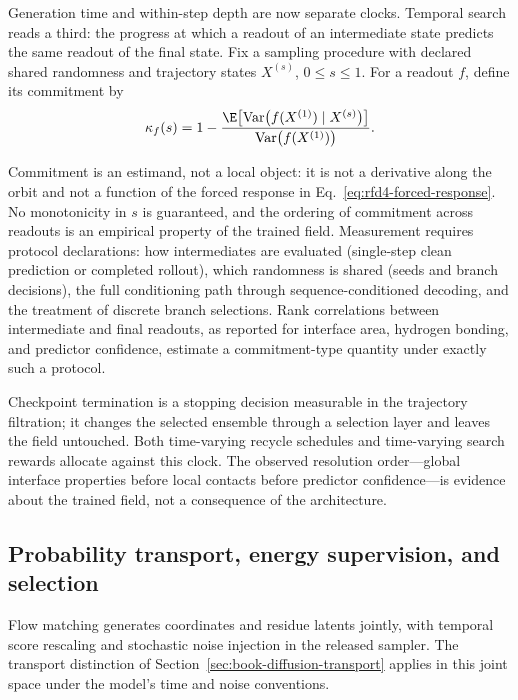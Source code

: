 Generation time and within-step depth are now separate clocks.  Temporal search reads a third:
the progress at which a readout of an intermediate state predicts the same readout of the final
state.  Fix a sampling procedure with declared shared randomness and trajectory states
$X^{(s)}$, $0\le s\le 1$.  For a readout $f$, define its commitment by
\begin{equation}
\kappa_f(s)
=1-\frac{\E\bigl[\operatorname{Var}\bigl(f(X^{(1)})\mid X^{(s)}\bigr)\bigr]}
{\operatorname{Var}\bigl(f(X^{(1)})\bigr)}.
\label{eq:rfd4-commitment}
\end{equation}

Commitment is an estimand, not a local object: it is not a derivative along the orbit and not a
function of the forced response in Eq.~\ref{eq:rfd4-forced-response}.  No monotonicity in $s$ is
guaranteed, and the ordering of commitment across readouts is an empirical property of the
trained field.  Measurement requires protocol declarations: how intermediates are evaluated
(single-step clean prediction or completed rollout), which randomness is shared (seeds and branch
decisions), the full conditioning path through sequence-conditioned decoding, and the treatment
of discrete branch selections.  Rank correlations between intermediate and final readouts, as
reported for interface area, hydrogen bonding, and predictor confidence, estimate a
commitment-type quantity under exactly such a protocol.

Checkpoint termination is a stopping decision measurable in the trajectory filtration; it
changes the selected ensemble through a selection layer and leaves the field untouched.  Both
time-varying recycle schedules and time-varying search rewards allocate against this clock.  The
observed resolution order---global interface properties before local contacts before predictor
confidence---is evidence about the trained field, not a consequence of the architecture.

\subsection{Probability transport, energy supervision, and selection}

Flow matching generates coordinates and residue latents jointly, with temporal score rescaling
and stochastic noise injection in the released sampler.  The transport distinction of
Section~\ref{sec:book-diffusion-transport} applies in this joint space under the model's time
and noise conventions.

